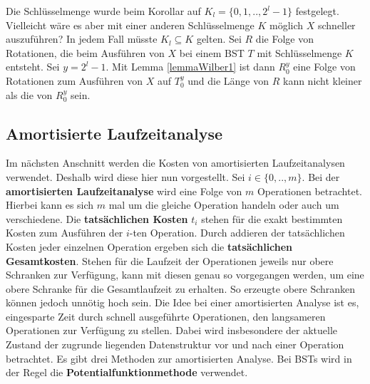 \documentclass[a4paper,12pt]{article}
\begin{document}
\noindent Die Schlüsselmenge  wurde beim Korollar auf ${K_l = \{0,1,..,2^l -1\}}$ festgelegt. Vielleicht wäre es aber mit einer anderen Schlüsselmenge $K$ möglich $X$ schneller auszuführen? In jedem Fall müsste $K_l \subseteq K$ gelten. Sei $R$ die Folge von Rotationen, die beim Ausführen von $X$ bei einem BST $T$ mit Schlüsselmenge $K$ entsteht. Sei $y = 2^l -1$. Mit Lemma \ref{lemmaWilber1} ist dann $R_0^y$ eine Folge von Rotationen zum Ausführen von $X$ auf $T_0^y$ und die Länge von $R$ kann nicht kleiner als die von $R_0^y$ sein. 



\subsection{Amortisierte Laufzeitanalyse}
Im nächsten Anschnitt werden die Kosten von amortisierten Laufzeitanalysen verwendet. Deshalb wird diese hier nun vorgestellt.
Sei $i \in \{0,..,m\}$. Bei der \textbf{amortisierten Laufzeitanalyse} wird eine Folge von $m$ Operationen betrachtet. Hierbei kann es sich $m$ mal um die gleiche Operation handeln oder auch um verschiedene. Die \textbf{tatsächlichen Kosten}  $t_i$ stehen für die exakt bestimmten Kosten zum Ausführen der $i$-ten Operation. Durch addieren der tatsächlichen Kosten jeder einzelnen Operation ergeben sich die \textbf{tatsächlichen Gesamtkosten}. Stehen für die Laufzeit der Operationen jeweils nur obere Schranken zur Verfügung, kann mit diesen genau so vorgegangen werden, um eine obere Schranke für die Gesamtlaufzeit zu erhalten. So erzeugte obere Schranken können jedoch unnötig hoch sein. Die Idee bei einer amortisierten Analyse ist es, eingesparte Zeit durch schnell ausgeführte Operationen, den langsameren Operationen zur Verfügung zu stellen. Dabei wird insbesondere der aktuelle Zustand der zugrunde liegenden Datenstruktur vor und nach einer Operation betrachtet. Es gibt drei Methoden zur amortisierten Analyse. Bei BSTs wird in der Regel die \textbf{Potentialfunktionmethode} verwendet.
\end{document}

